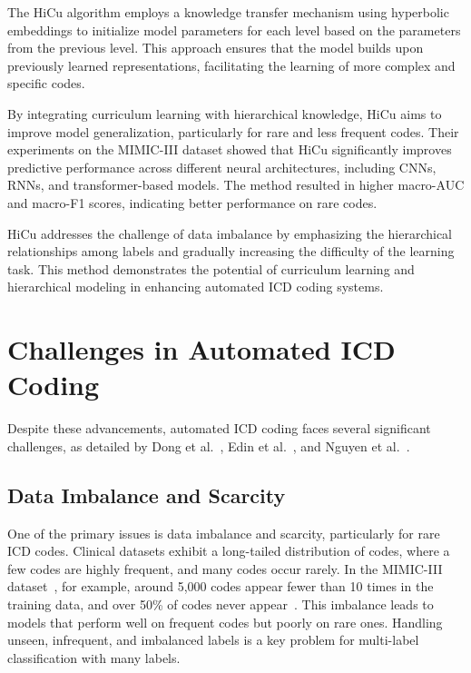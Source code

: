 \documentclass[12pt,a4paper]{report}
\begin{document}
The HiCu algorithm employs a knowledge transfer mechanism using hyperbolic embeddings to initialize model parameters for each level based on the parameters from the previous level. This approach ensures that the model builds upon previously learned representations, facilitating the learning of more complex and specific codes.

By integrating curriculum learning with hierarchical knowledge, HiCu aims to improve model generalization, particularly for rare and less frequent codes. Their experiments on the MIMIC-III dataset showed that HiCu significantly improves predictive performance across different neural architectures, including CNNs, RNNs, and transformer-based models. The method resulted in higher macro-AUC and macro-F1 scores, indicating better performance on rare codes.

HiCu addresses the challenge of data imbalance by emphasizing the hierarchical relationships among labels and gradually increasing the difficulty of the learning task. This method demonstrates the potential of curriculum learning and hierarchical modeling in enhancing automated ICD coding systems.

\section{Challenges in Automated ICD Coding}

Despite these advancements, automated ICD coding faces several significant challenges, as detailed by Dong et al.~\cite{dong2022automated}, Edin et al.~\cite{edin2023automated}, and Nguyen et al.~\cite{nguyen2023mimic}.

\subsection{Data Imbalance and Scarcity}

One of the primary issues is data imbalance and scarcity, particularly for rare ICD codes. Clinical datasets exhibit a long-tailed distribution of codes, where a few codes are highly frequent, and many codes occur rarely. In the MIMIC-III dataset~\cite{johnson2016mimic}, for example, around 5,000 codes appear fewer than 10 times in the training data, and over 50\% of codes never appear~\cite{rios2018few}. This imbalance leads to models that perform well on frequent codes but poorly on rare ones. Handling unseen, infrequent, and imbalanced labels is a key problem for multi-label classification with many labels.
\end{document}
